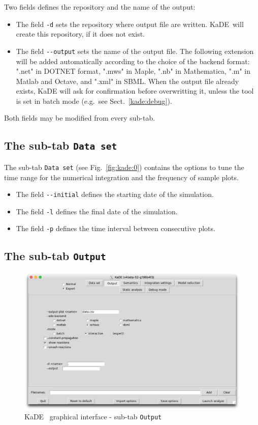 \documentclass[11pt]{book}
\def\KaDE{\textsf{KaDE}}
\begin{document}
Two fields defines the repository and the name of the output:
\begin{itemize}
\item The field \texttt{-d} sets  the repository where output file are written. \KaDE~will create this repository, if it does not exist.
\item The field \texttt{-{}-output} sets the name of the output file.
The following extension will be added automatically according to the choice of the backend format: ".net" in DOTNET format, ".mws" in Maple, ".nb" in Mathematica, ".m" in Matlab and Octave, and ".xml" in SBML. When the output file already exists, {\KaDE} will ask for confirmation before overwritting it, unless the tool is set in batch mode (e.g.~see Sect.~\ref{kade:debug}).
\end{itemize}
Both fields may be modified from every sub-tab.




\subsection{The sub-tab \texttt{Data set}}

The sub-tab \texttt{Data set} (see Fig.~\ref{fig:kade:0}) contains the options to tune the time range for the numerical integration and the frequency of sample plots.
\begin{itemize}
\item The field \texttt{-{}-initial} defines the starting date of the simulation.
\item The field \texttt{-l} defines the final date of the simulation.
\item The field \texttt{-p} defines the time interval between consecutive plots.
\end{itemize}

\subsection{The sub-tab \texttt{Output}}

\begin{figure}[htbp]
\centering
\includegraphics[width=12cm,bb=0 0 1904 1208]{img/kade_1.png}
\caption{\KaDE~ graphical interface - sub-tab \texttt{Output}}
\label{fig:kade:1}
\end{figure}
\end{document}
